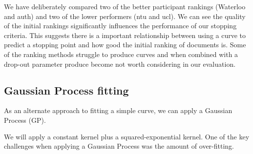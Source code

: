 We have deliberately compared two of the better participant rankings (Waterloo and auth) and two of the lower performers (ntu and ucl). We can see the quality of the initial rankings significantly influences the performance of our stopping criteria. This suggests there is a important relationship between using a curve to predict a stopping point and how good the initial ranking of documents is. Some of the ranking methods struggle to produce curves and when combined with a drop-out parameter produce become not worth considering in our evaluation.


\subsection{Gaussian Process fitting}

As an alternate approach to fitting a simple curve, we can apply a Gaussian Process (GP).

We will apply a constant kernel plus a squared-exponential kernel. One of the key challenges when applying a Gaussian Process was the amount of over-fitting.  




\begin{table}[H]
\caption{Comparison of different of sample method using gp for different CLEF 2017 runs. lower = lower-bound confidence interval. Sample size = 3. Results are taken as averages over all topics for search method. with 0.5\% cut-off}

\end{table}

